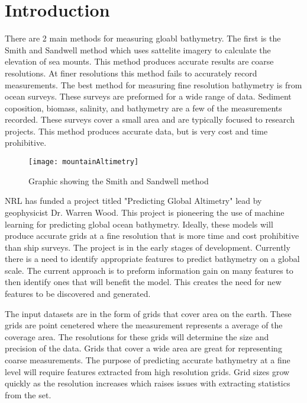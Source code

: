 \section{Introduction}
There are 2 main methods for measuring gloabl bathymetry.
The first is the Smith and Sandwell method which uses sattelite imagery to calculate the elevation of sea mounts.
This method produces accurate results are coarse resolutions.
At finer resolutions this method fails to accurately record measurements.
The best method for measuring fine resolution bathymetry is from ocean surveys.
These surveys are preformed for a wide range of data.
Sediment coposition, biomass, salinity, and bathymetry are a few of the measurements recorded.
These surveys cover a small area and are typically focused to research projects. 
This method produces accurate data, but is very cost and time prohibitive. 
\begin{figure}[hb]
    \centering
    \texttt{[image: mountainAltimetry]}
    \caption{Graphic showing the Smith and Sandwell method}
  \end{figure}

\par
NRL has funded a project titled "Predicting Global Altimetry" lead by geophysicist Dr. Warren Wood.
This project is pioneering the use of machine learning for predicting global ocean bathymetry.
Ideally, these models will produce accurate grids at a fine resolution that is more time and cost prohibitive than ship surveys.
The project is in the early stages of development. 
Currently there is a need to identify appropriate features to predict bathymetry on a global scale. 
The current approach is to preform information gain on many features to then identify ones that will benefit the model.
This creates the need for new features to be discovered and generated. 

\par
The input datasets are in the form of grids that cover area on the earth. 
These grids are point cenetered where the measurement represents a average of the coverage area.
The resolutions for these grids will determine the size and precision of the data.
Grids that cover a wide area are great for representing coarse measurements.
The purpose of predicting accurate bathymetry at a fine level will require features extracted from high resolution grids.
Grid sizes grow quickly as the resolution increases which raises issues with extracting statistics from the set.
